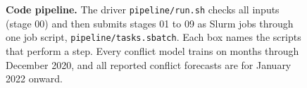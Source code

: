 \begin{figure}[!htbp]
{%
}
\caption{\textbf{Code pipeline.} The driver \texttt{pipeline/run.sh} checks all inputs (stage 00) and then submits stages 01 to 09 as Slurm jobs through one job script, \texttt{pipeline/tasks.sbatch}. Each box names the scripts that perform a step. Every conflict model trains on months through December 2020, and all reported conflict forecasts are for January 2022 onward.}
\label{fig:pipeline}
\end{figure}
